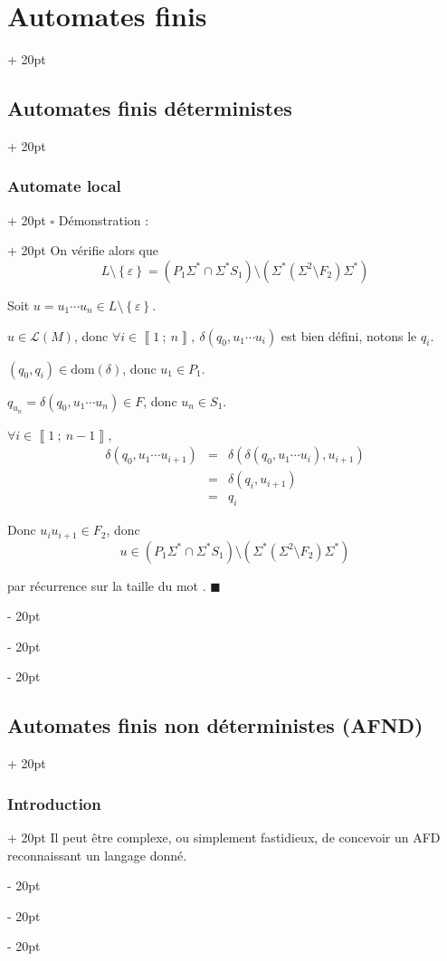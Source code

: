 \documentclass[a4paper, 12pt, twoside]{article}
\newcommand{\nset}[2]{\left\llbracket #1\ ;\ #2 \right\rrbracket}
\newcommand{\lr}[1]{\left( #1 \right)}
\newcommand{\set}[1]{\left\{ #1 \right\}}
\newcommand{\ind}[1][20pt]{\advance\leftskip + #1}
\newcommand{\deind}[1][20pt]{\advance\leftskip - #1}
\newenvironment{indt}[2][20pt]{#2 \par \ind[#1]}{\par \deind} %
\newenvironment{proof}[1][{Démonstration :}]{\begin{indt}{$\square$ #1}}{$\blacksquare$ \end{indt}}
\begin{document}
\begin{indt}{\section{Automates finis}}
\begin{indt}{\subsection{Automates finis déterministes}}
\begin{indt}{\subsubsection{Automate local}}
\begin{proof}
                On vérifie alors que
                \[
                    L \setminus \set \varepsilon
                    = (P_1 \Sigma^* \cap \Sigma^* S_1) \setminus \lr{\Sigma^* \lr{\Sigma^2 \setminus F_2} \Sigma^*}
                \]

                \boxed{\subseteq} Soit $u = u_1 \cdots u_n \in L \setminus \set \varepsilon$.

                $u \in \mathcal L(M)$, donc $\forall i \in \nset 1 n,\ \delta(q_0, u_1 \cdots u_i)$ est bien défini, notons le $q_i$.

                $(q_0, q_i) \in \mathrm{dom}(\delta)$, donc $u_1 \in P_1$.

                $q_{u_n} = \delta(q_0, u_1 \cdots u_n) \in F$, donc $u_n \in S_1$.

                $\forall i \in \nset 1 {n - 1}$,
                \[
                    \begin{array}{rcl}
                        \delta(q_0, u_1 \cdots u_{i + 1})
                        &=& \delta(\delta(q_0, u_1 \cdots u_i), u_{i + 1})
                        \\
                        &=& \delta(q_i, u_{i + 1})
                        \\
                        &=& q_i
                    \end{array}
                \]

                Donc $u_i u_{i + 1} \in F_2$, donc
                \[
                    u \in (P_1 \Sigma^* \cap \Sigma^* S_1) \setminus \lr{\Sigma^* \lr{\Sigma^2 \setminus F_2} \Sigma^*}
                \]

                \vspace{6pt}
                
                \boxed{\supseteq} par récurrence sur la taille du mot .
                \end{proof}
            \end{indt}
        \end{indt}

        \vspace{12pt}
        
        \begin{indt}{\subsection{Automates finis non déterministes (AFND)}}
            \begin{indt}{\subsubsection{Introduction}}
                Il peut être complexe, ou simplement fastidieux, de concevoir un AFD reconnaissant un langage donné.


\end{indt}
\end{indt}
\end{indt}
\end{document}
